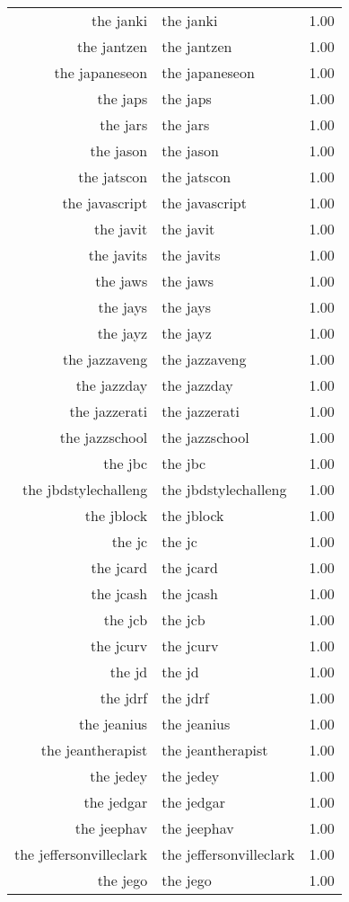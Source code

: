 \begin{table}[ht]
\begin{tabular}{rlr}
  the janki & the janki & 1.00 \\ 
  the jantzen & the jantzen & 1.00 \\ 
  the japaneseon & the japaneseon & 1.00 \\ 
  the japs & the japs & 1.00 \\ 
  the jars & the jars & 1.00 \\ 
  the jason & the jason & 1.00 \\ 
  the jatscon & the jatscon & 1.00 \\ 
  the javascript & the javascript & 1.00 \\ 
  the javit & the javit & 1.00 \\ 
  the javits & the javits & 1.00 \\ 
  the jaws & the jaws & 1.00 \\ 
  the jays & the jays & 1.00 \\ 
  the jayz & the jayz & 1.00 \\ 
  the jazzaveng & the jazzaveng & 1.00 \\ 
  the jazzday & the jazzday & 1.00 \\ 
  the jazzerati & the jazzerati & 1.00 \\ 
  the jazzschool & the jazzschool & 1.00 \\ 
  the jbc & the jbc & 1.00 \\ 
  the jbdstylechalleng & the jbdstylechalleng & 1.00 \\ 
  the jblock & the jblock & 1.00 \\ 
  the jc & the jc & 1.00 \\ 
  the jcard & the jcard & 1.00 \\ 
  the jcash & the jcash & 1.00 \\ 
  the jcb & the jcb & 1.00 \\ 
  the jcurv & the jcurv & 1.00 \\ 
  the jd & the jd & 1.00 \\ 
  the jdrf & the jdrf & 1.00 \\ 
  the jeanius & the jeanius & 1.00 \\ 
  the jeantherapist & the jeantherapist & 1.00 \\ 
  the jedey & the jedey & 1.00 \\ 
  the jedgar & the jedgar & 1.00 \\ 
  the jeephav & the jeephav & 1.00 \\ 
  the jeffersonvilleclark & the jeffersonvilleclark & 1.00 \\ 
  the jego & the jego & 1.00 \\ 

\end{tabular}
\end{table}
